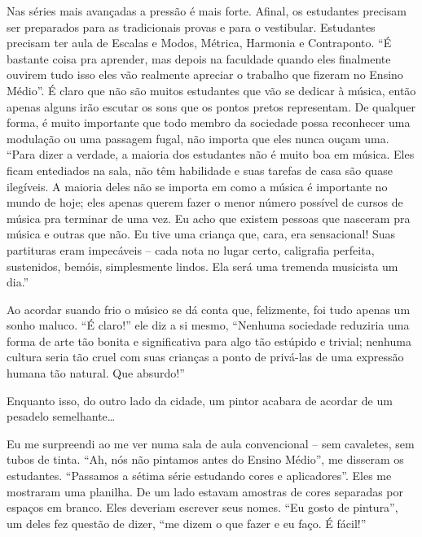 \documentclass[a4paper,oneside,10pt,notitlepage]{article}
\begin{document}
Nas séries mais avançadas a pressão é mais forte.
Afinal, os estudantes precisam ser preparados para as tradicionais provas e para o vestibular.
Estudantes precisam ter aula de Escalas e Modos, Métrica, Harmonia e Contraponto.
``É bastante coisa pra aprender, mas depois na faculdade quando eles finalmente ouvirem tudo isso eles vão realmente apreciar o trabalho que fizeram no Ensino Médio''.
É claro que não são muitos estudantes que vão se dedicar à música, então apenas alguns irão escutar os sons que os pontos pretos representam.
De qualquer forma, é muito importante que todo membro da sociedade possa reconhecer uma modulação ou uma passagem fugal, não importa que eles nunca ouçam uma.
``Para dizer a verdade, a maioria dos estudantes não é muito boa em música.
Eles ficam entediados na sala, não têm habilidade e suas tarefas de casa são quase ilegíveis.
A maioria deles não se importa em como a música é importante no mundo de hoje;
eles apenas querem fazer o menor número possível de cursos de música pra terminar de uma vez.
Eu acho que existem pessoas que nasceram pra música e outras que não.
Eu tive uma criança que, cara, era sensacional!
Suas partituras eram impecáveis -- cada nota no lugar certo, caligrafia perfeita, sustenidos, bemóis, simplesmente lindos.
Ela será uma tremenda musicista um dia.''

Ao acordar suando frio o músico se dá conta que, felizmente, foi tudo apenas um sonho maluco.
``É claro!'' ele diz a si mesmo,
``Nenhuma sociedade reduziria uma forma de arte tão bonita e significativa para algo tão estúpido e trivial;
nenhuma cultura seria tão cruel com suas crianças a ponto de privá-las de uma expressão humana tão natural.
Que absurdo!''

Enquanto isso, do outro lado da cidade, um pintor acabara de acordar de um pesadelo semelhante\ldots

\vspace{1em}

Eu me surpreendi ao me ver numa sala de aula convencional -- sem cavaletes, sem tubos de tinta.
``Ah, nós não pintamos antes do Ensino Médio'',
me disseram os estudantes.
``Passamos a sétima série estudando cores e aplicadores''.
Eles me mostraram uma planilha.
De um lado estavam amostras de cores separadas por espaços em branco.
Eles deveriam escrever seus nomes.
``Eu gosto de pintura'',
um deles fez questão de dizer,
``me dizem o que fazer e eu faço. É fácil!''
\end{document}
